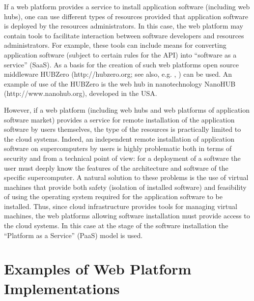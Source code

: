\documentclass[procedia]{easychair}
\begin{document}
If a web platform provides a service to install application software (including web hubs), one can use different types of resources provided that application software is deployed by the resources administrators. In this case, the web platform may contain tools to facilitate interaction between software developers and resources administrators. For example, these tools can include means for converting application software (subject to certain rules for the API) into ``software as a service'' (SaaS). As a basis for the creation of such web platforms open source middleware HUBZero (http://hubzero.org; see also, e.g. , \cite{9}) can be used. An example of use of the HUBZero is the web hub in nanotechnology NanoHUB (http://www.nanohub.org), developed in the USA.

However, if a web platform (including web hubs and web platforms of application software market) provides a service for remote installation of the application software by users themselves, the type of the resources is practically limited to the cloud systems. Indeed, an independent remote installation of application software on supercomputers by users is highly problematic both in terms of security and from a technical point of view: for a deployment of a software the user must deeply know the features of the architecture and software of the specific supercomputer. A natural solution to these problems is the use of virtual machines \cite{10} that provide both safety (isolation of installed software) and feasibility of using the operating system required for the application software to be installed. Thus, since cloud infrastructure provides tools for managing virtual machines, the web platforms allowing software installation must provide access to the cloud systems. In this case at the stage of the software installation the ``Platform as a Service'' (PaaS) model is used.

\section{Examples of Web Platform Implementations}
\label{sect:examples}
\end{document}
